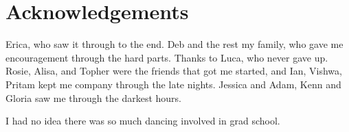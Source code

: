 \chapter{Acknowledgements}

Erica, who saw it through to the end.
Deb and the rest my family, who gave me encouragement through the hard parts.
Thanks to Luca, who never gave up.
Rosie, Alisa, and Topher were the friends that got me started,
and Ian, Vishwa, Pritam kept me company through the late nights.
Jessica and Adam, Kenn and Gloria saw me through the darkest hours.

I had no idea there was so much dancing involved in grad school.

